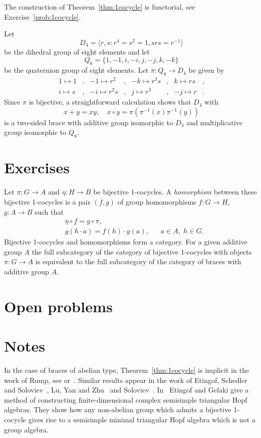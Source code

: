 The construction of Theorem~\ref{thm:1cocycle} is functorial, see Exercise~\ref{prob:1cocycle}.

\begin{example}
	\label{exa:d8q8}
	Let 
	\[
	D_4=\langle r,s:r^4=s^2=1,srs=r^{-1}\rangle
	\]
	be the dihedral group of eight elements and let
	\[
	Q_8=\{1,-1,i,-i,j,-j,k,-k\}
	\]
	be the quaternion group of eight elements.  Let
	$\pi:Q_8\to D_4$ be given by 
	\begin{align*}
		1\mapsto 1 &, & -1\mapsto r^2 &,  & -k\mapsto r^3s &,&  k\mapsto rs &,\\
		i\mapsto s &, & -i\mapsto r^2s &, &  j\mapsto r^3 &, & -j\mapsto r &.
	\end{align*}
	Since $\pi$ is bijective, 
	a straightforward calculation shows that $D_4$ with 
	\[
	  x+y=xy,\quad 
	  x\circ y=\pi(\pi^{-1}(x)\pi^{-1}(y))
	\]
	is a two-sided brace with additive group isomorphic to $D_4$ and multiplicative group
	isomorphic to $Q_8$. 
\end{example}

\section*{Exercises}

\begin{prob}
\label{prob:1cocycle}
Let $\pi\colon G\to A$ and $\eta\colon H\to B$ be bijective 1-cocycles.  A
\emph{homorphism} between these bijective 1-cocycles is a pair $(f,g)$ of
group homomorphisms  $f\colon G\to H$, $g\colon A\to B$ such that
\begin{align*}
&\eta\circ f=g\circ \pi,\\
&g(h\cdot a)=f(h)\cdot g(a),&&a\in A,\;h\in G.
\end{align*}
Bijective 1-cocycles and homomorphisms form a category. 
For a given additive group $A$ 
the full subcategory of the category of bijective 1-cocycles with objects
$\pi\colon G\to A$ is equivalent to the full subcategory of the category of
braces with additive group $A$. 
\end{prob}

\section*{Open problems}

\section*{Notes}

In the case of braces of abelian type, Theorem~\ref{thm:1cocycle} is implicit in the work of Rump, see \cite{MR2278047,MR3291816} or~\cite{MR3177933}. Similar results appear 
in the work of Etingof, Schedler and Soloviev~\cite{MR1722951}, Lu, Yan and Zhu~\cite{MR1769723} 
and Soloviev~\cite{MR1809284}.
In~\cite{MR1653340} Etingof and Gelaki give a method of constructing finite-dimensional complex semisimple triangular Hopf algebras. They show how any non-abelian group which admits a bijective 1-cocycle gives rise to a semisimple minimal triangular Hopf algebra which is not a group algebra.